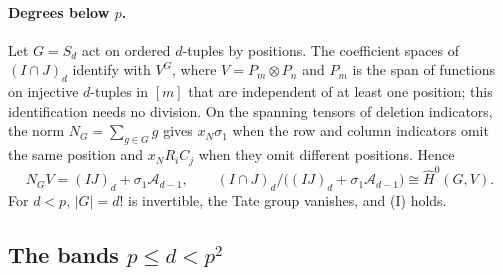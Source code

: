 \paragraph{Degrees below $p$.}  Let $G=S_d$ act on ordered $d$-tuples by positions.  The
coefficient spaces of $(I\cap J)_d$ identify with $V^G$, where $V=P_m\otimes P_n$ and $P_m$ is
the span of functions on injective $d$-tuples in $[m]$ that are independent of at least one
position; this identification needs no division.  On the spanning tensors of deletion
indicators, the norm $N_G=\sum_{g\in G}g$ gives $x_N\sigma_1$ when the row and column
indicators omit the same position and $x_NR_iC_j$ when they omit different positions.  Hence
\[
  N_GV=(IJ)_d+\sigma_1\mathcal A_{d-1},\qquad
  (I\cap J)_d\big/\bigl((IJ)_d+\sigma_1\mathcal A_{d-1}\bigr)\cong\hat H^0(G,V).
\]
For $d<p$, $|G|=d!$ is invertible, the Tate group vanishes, and (I) holds.

\subsection{The bands \texorpdfstring{$p\le d<p^2$}{p <= d < p^2}}\label{sec:bands-high}

